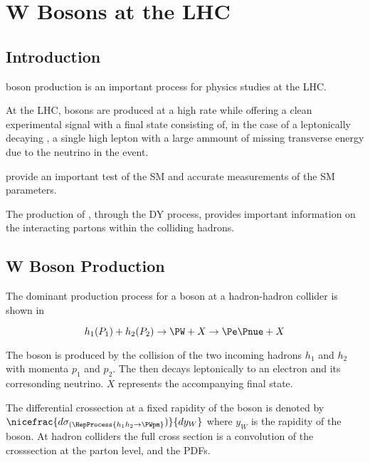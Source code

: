 
\chapter{W Bosons at the LHC}

\section{Introduction}

\PW boson production is an important process for physics studies at the LHC.

At the \ac{LHC}, \PW bosons are produced at a high rate while offering a clean
experimental signal with a final state consisting of, in the case of a
leptonically decaying \PW, a single high \PT lepton with a large ammount of
missing transverse energy due to the neutrino in the event.

\PW provide an important test of the \ac{SM} and accurate measurements of the
\ac{SM} parameters. 

The production of \PW, through the \ac{DY} process, provides important
information on the interacting partons within the colliding hadrons.

\section{W Boson Production}

The dominant production process for a \PW boson at a hadron-hadron collider is
shown in 

\begin{equation}
  h_1(P_1) + h_2(P_2)
  \to 
  \PW + X
  \to
  \Pe \Pnue + X
  \label{wbos:dyproc}
\end{equation}

The \PW boson is produced by the collision of the two incoming hadrons $h_1$
and $h_2$ with momenta $p_1$ and $p_2$. The \PW then decays leptonically to an
electron and its corresonding neutrino. $X$ represents the accompanying final
state.




The differential crossection at a fixed rapidity of the \PW boson is denoted by
$\nicefrac{d\sigma_{(\HepProcess{h_1 h_2 \to \PWpm}})}{dy_W}$ where $y_W$ is
the rapidity of the \PW boson. 
At hadron colliders the full cross section is a convolution of the crosssection
at the parton level, and the \acp{PDF}.


